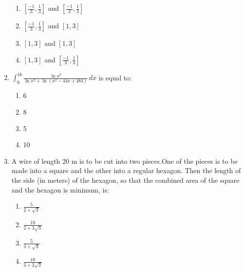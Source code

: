 \documentclass[journal]{IEEEtran}
\numberwithin{equation}{enumi}
\numberwithin{figure}{enumi}
\begin{document}
\begin{enumerate}
    \begin{multicols}{2}
    \begin{enumerate}
        \item $\left[\frac{-1}{3},\frac{1}{3}\right]$ and $\left[\frac{-1}{3},\frac{1}{3}\right]$\\
        \item $\left[\frac{-1}{3},\frac{1}{3}\right]$ and $\left[1,3\right]$
        \item $\left[1,3\right]$ and $\left[1,3\right]$\\
        \item $\left[1,3\right]$ and $\left[\frac{-1}{3},\frac{1}{3}\right]$
    \end{enumerate}
    \end{multicols}
    \item $\int_{6}^{16} \frac{\ln x^2}{\ln{x^2} + \ln{(x^2 - 44x + 484)}} \, dx$ is equal to: \\
    \begin{multicols}{4}
    \begin{enumerate}
        \item 6
        \item 8
        \item 5
        \item 10
    \end{enumerate} 
    \end{multicols}
    \item A wire of length 20 m is to be cut into two pieces.One of the pieces is to be made into a square and the other into a regular hexagon. Then the length of the side (in meters) of the hexagon, so that the combined area of the square and the hexagon is minimum, is:  \\
    \begin{multicols}{4}
    \begin{enumerate}
        \item $\frac{5}{2 + \sqrt{3}}$
        \item $\frac{10}{2 + 3\sqrt{3}}$
        \item $\frac{5}{3 + \sqrt{3}}$
        \item $\frac{10}{3 + 2\sqrt{3}}$
    \end{enumerate} 
    \end{multicols}
\end{enumerate}
\end{document}
